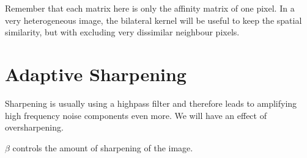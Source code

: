 Remember that each matrix here is only the affinity matrix of one pixel.
In a very heterogeneous image, the bilateral kernel will be useful to keep the spatial similarity, but with excluding very dissimilar neighbour pixels.

\section{Adaptive Sharpening}

Sharpening is usually using a highpass filter and therefore leads to amplifying high frequency noise components even more.
We will have an effect of oversharpening.

\(\beta \) controls the amount of sharpening of the image.


